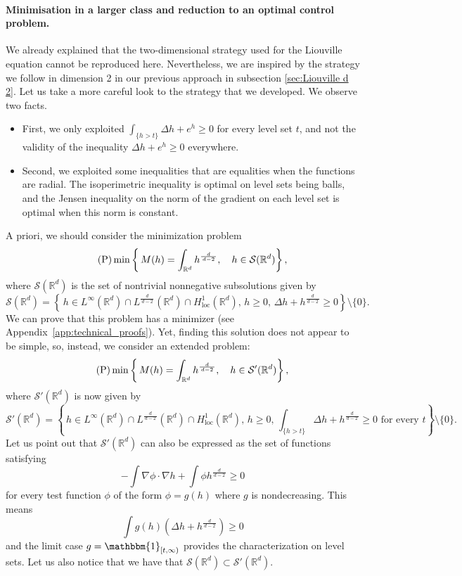 \documentclass[11pt,a4paper]{article}
\numberwithin{equation}{section}
\newcommand{\R}{{\mathbb{R}}}
\theoremstyle{plain}
\theoremstyle{remark}
\newcommand {\f}{\frac}
\newcommand{\ind}{\mathbbm{1}}
\begin{document}
\paragraph{Minimisation in a larger class and reduction to an optimal control problem.}

We already explained that the two-dimensional strategy used for the Liouville equation cannot be reproduced here. Nevertheless, we are inspired by the strategy we follow in dimension 2 in our previous approach in subsection \ref{sec:Liouville d 2}. Let us take a more careful look to the strategy that we developed. We observe two facts.
\begin{itemize}
\item First, we only exploited $\int_{\{h>t\}}\Delta h+e^h\geq 0$ for every level set $t$, and not the validity of the inequality $\Delta h+e^h\geq 0$ everywhere. 
\item Second, we exploited some inequalities that are equalities when the functions are radial. The isoperimetric inequality is optimal on level sets being balls, and the Jensen inequality on the norm of the gradient on each level set is optimal when this norm is constant.
\end{itemize}
A priori, we should consider the minimization problem
\begin{equation*}\tag{\normalfont{P}}
    \min\left\{\,M(h)  =  \int_{\mathbb{R}^d} h^{\f{d}{\,d-2\,}},\quad h \in \mathcal{S}(\R^d)\right\}, 
\end{equation*}
where $\mathcal{S}(\R^d)$ is the set of nontrivial nonnegative subsolutions given by
\[
    \mathcal{S}(\R^d)  = \left\{\,h \in L^\infty(\R^d)\cap L^{\f{d}{\,d-2\,}}(\R^d)\cap H^1_{\mathrm{loc}}(\R^d), \,  h\ge0, \, \Delta h + h^{\f{d}{\,d-2\,}}\ge 0 \right\} \setminus \{0\}.
\]
We can prove that this problem has a minimizer (see Appendix~\ref{app:technical_proofs}). Yet, finding this solution does not appear to be simple, so, instead, we consider an extended problem:
\begin{equation}\tag{\normalfont{P}}
    \min\left\{\,M(h)  =  \int_{\mathbb{R}^d} h^{\f{d}{\,d-2\,}},\quad h \in \mathcal{S'}(\R^d)\right\}, \label{eq:Min problem}
\end{equation}
where $\mathcal{S'}(\R^d)$ is now given by
\[
    \mathcal{S'}(\R^d)  = \left\{\,h \in L^\infty(\R^d)\cap L^{\f{d}{\,d-2\,}}(\R^d)\cap H^1_{\mathrm{loc}}(\R^d), \,  h\ge0, \, \int_{\{h>t\}} \! \! \! \! \! \! \! \Delta h + h^{\f{d}{\,d-2\,}}\ge 0 \text{ for every } t \right\} \setminus \{0\}.
\]
Let us point out that $\mathcal{S'}(\R^d)$ can  also be expressed as the set of functions satisfying
$$
    - \int \nabla\phi\cdot\nabla h+\int \phi h^{\f{d}{\,d-2\,}}\geq 0
$$
for every test function $\phi$ of the form $\phi=g(h)$ where $g$ is nondecreasing. This means 
$$
    \int g(h)\left( \Delta h + h^{\f{d}{\,d-2\,}}\right)\ge 0
$$ 
and the limit case $g=\ind_{[t,\infty)}$ provides the characterization on level sets. Let us also notice that we have that $\mathcal{S}(\R^d)\subset \mathcal{S'}(\R^d)$. 
\end{document}
